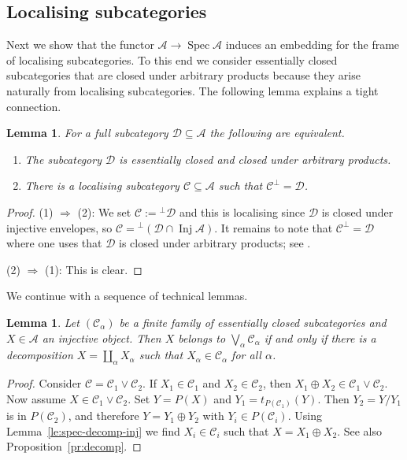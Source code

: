 \documentclass[a4paper]{amsart}
\theoremstyle{plain}
\newtheorem{lem}[thm]{Lemma}
\theoremstyle{definition}
\theoremstyle{remark}
\numberwithin{equation}{section}
\newcommand{\Inj}{\operatorname{Inj}}
\newcommand{\Spec}{\operatorname{Spec}}
\def\A{\mathcal A}
\def\C{\mathcal C}
\def\D{\mathcal D}
\def\a{\alpha}
\begin{document}
\subsection*{Localising subcategories}

Next we show that the functor $\A\to\Spec\A$ induces an embedding for
the frame of localising subcategories. To this end we consider
essentially closed subcategories that are closed under arbitrary products
because they arise naturally from localising subcategories. The
following lemma explains a tight connection.
  
\begin{lem}\label{le:tf1}
    For a full subcategory $\D\subseteq\A$ the following are
    equivalent.
\begin{enumerate}
\item The subcategory $\D$ is essentially closed and closed under arbitrary
  products.
\item There is a localising subcategory $\C\subseteq\A$ such that
  $\C^\perp=\D$.
\end{enumerate}
\end{lem}

\begin{proof}
  (1) $\Rightarrow$ (2): We set $\C:={^\perp\D}$ and this is
  localising since $\D$ is closed under injective envelopes, so
  $\C={^\perp(\D\cap\Inj\A)}$. It remains to note that $\C^\perp=\D$
  where one uses that $\D$ is closed under arbitrary products; see
  \cite[Proposition~VI.2.2]{St1975}.
  
(2) $\Rightarrow$ (1): This is clear.
\end{proof}

We continue with a sequence of technical lemmas. 

\begin{lem}\label{le:tf3}
  Let $(\C_\a)$ be a finite family of essentially closed subcategories and
  $X\in\A$ an injective object. Then $X$ belongs to
  $\bigvee_\a\C_\a$ if and only if there is a decomposition
  $X=\coprod_\a X_\a$ such that $X_\a\in\C_\a$ for all $\a$.
\end{lem}

\begin{proof}
Consider $\C=\C_1\vee\C_2$.  If $X_1\in\C_1$ and $X_2\in\C_2$, then
  $X_1\oplus X_2\in\C_1\vee\C_2$.  Now assume $X\in\C_1\vee\C_2$. Set
  $Y=P(X)$ and $Y_1=t_{P(\C_1)}(Y)$. Then $Y_2=Y/Y_1$ is in
  $P(\C_2)$, and therefore $Y=Y_1\oplus Y_2$ with $Y_i\in P(\C_i)$. Using
  Lemma~\ref{le:spec-decomp-inj} we find $X_i\in\C_i$ such that
  $X=X_1\oplus X_2$.  See also Proposition~\ref{pr:decomp}.
\end{proof}
\end{document}
